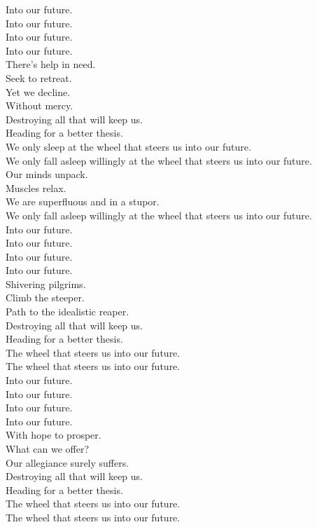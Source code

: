 Into our future. \\
Into our future. \\
Into our future. \\
Into our future. \\

There's help in need. \\
Seek to retreat. \\
Yet we decline. \\
Without mercy. \\
Destroying all that will keep us. \\
Heading for a better thesis. \\

We only sleep at the wheel that steers us into our future. \\
We only fall asleep willingly at the wheel that steers us into our future. \\
Our minds unpack. \\
Muscles relax. \\
We are superfluous and in a stupor. \\
We only fall asleep willingly at the wheel that steers us into our future. \\

Into our future. \\
Into our future. \\
Into our future. \\
Into our future. \\

Shivering pilgrims. \\
Climb the steeper. \\
Path to the idealistic reaper. \\
Destroying all that will keep us. \\
Heading for a better thesis. \\

The wheel that steers us into our future. \\
The wheel that steers us into our future. \\

Into our future. \\
Into our future. \\
Into our future. \\
Into our future. \\

With hope to prosper. \\
What can we offer? \\
Our allegiance surely suffers. \\
Destroying all that will keep us. \\
Heading for a better thesis. \\

The wheel that steers us into our future. \\
The wheel that steers us into our future. \\
